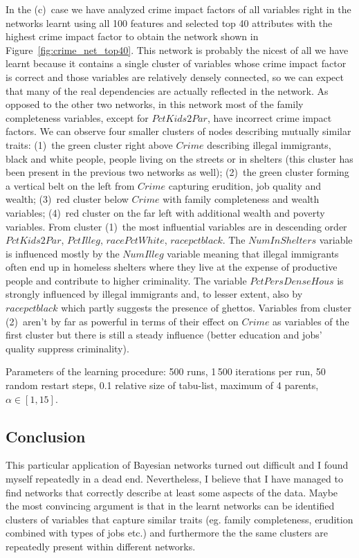 \documentclass[english,cover]{fitthesis} %
\begin{document}
In the (c)~case we have analyzed crime impact factors of all variables right in the networks learnt using all 100 features and selected top 40 attributes with the highest crime impact factor to obtain the network shown in Figure~\ref{fig:crime_net_top40}. This network is probably the nicest of all we have learnt because it contains a single cluster of variables whose crime impact factor is correct and those variables are relatively densely connected, so we can expect that many of the real dependencies are actually reflected in the network. As opposed to the other two networks, in this network most of the family completeness variables, except for $PctKids2Par$, have incorrect crime impact factors. We can observe four smaller clusters of nodes describing mutually similar traits: (1)~the green cluster right above $Crime$ describing illegal immigrants, black and white people, people living on the streets or in shelters (this cluster has been present in the previous two networks as well); (2)~the green cluster forming a vertical belt on the left from $Crime$ capturing erudition, job quality and wealth; (3)~red cluster below $Crime$ with family completeness and wealth variables; (4)~red cluster on the far left with additional wealth and poverty variables. From cluster (1)~the most influential variables are in descending order $PctKids2Par$, $PctIlleg$, $racePctWhite$, $racepctblack$. The $NumInShelters$ variable is influenced mostly by the $NumIlleg$ variable meaning that illegal immigrants often end up in homeless shelters where they live at the expense of productive people and contribute to higher criminality. The variable $PctPersDenseHous$ is strongly influenced by illegal immigrants and, to lesser extent, also by $racepctblack$ which partly suggests the presence of ghettos. Variables from cluster (2)~aren't by far as powerful in terms of their effect on $Crime$ as variables of the first cluster but there is still a steady influence (better education and jobs' quality suppress criminality).


\medskip
Parameters of the learning procedure: 500 runs, 1\,500 iterations per run, 50 random restart steps, 0.1 relative size of tabu-list, maximum of 4 parents, $\alpha \in [1, 15]$.



\subsection{Conclusion}
This particular application of Bayesian networks turned out difficult and I found myself repeatedly in a dead end. Nevertheless, I believe that I have managed to find networks that correctly describe at least some aspects of the data. Maybe the most convincing argument is that in the learnt networks can be identified clusters of variables that capture similar traits (eg. family completeness, erudition combined with types of jobs etc.) and furthermore the the same clusters are repeatedly present within different networks.
\end{document}
